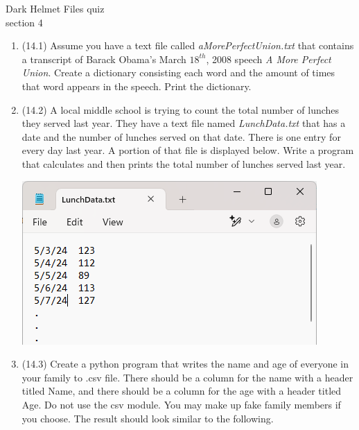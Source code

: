 \documentclass{article}
\begin{document}
\pagebreak
Dark Helmet \hfill Files quiz\\
section 4\\
\begin{enumerate}
\item (14.1)
		Assume you have a text file called \textit{aMorePerfectUnion.txt} that contains a transcript 
		of Barack Obama's March $18^{th}$, 2008 speech \textit{A More Perfect Union}. Create a 
		dictionary consisting each word and the amount of times that word appears in the speech. 
		Print the dictionary.


\item (14.2) 
		A local middle school is trying to count the total number of lunches they served last year.  
		They have a text file named \textit{LunchData.txt} that has a date and the number of lunches served on that date.    
		There is one entry for every day last year.  A portion of that file is displayed below.  
		Write a program that calculates and then prints the total number of lunches served last year. 
		\begin{flushright}
			\includegraphics[scale=.65]{imgs/LunchData.PNG}
		\end{flushright}




\item (14.3) 
		Create a python program that writes the name and age of everyone in your family to .csv file.
		There should be a column for the name with a header titled Name, and there should be a column 
		for the age with a header titled Age.
		Do not use the csv module. You may make up fake family members if you choose. The result
		should look similar to the following.
		

\end{enumerate}
\end{document}
